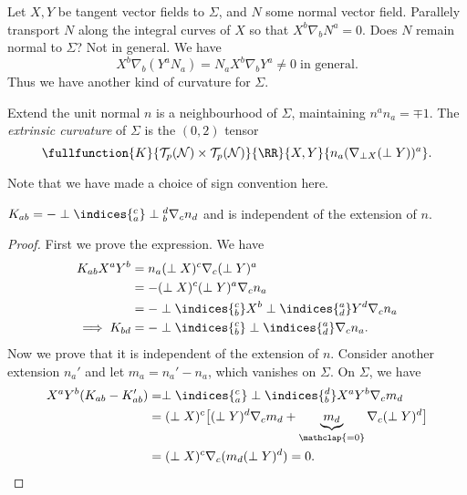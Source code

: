 \documentclass{jknotes}
\begin{document}
Let \(X,Y\) be tangent vector fields to \(\Sigma\), and \(N\) some normal vector field. Parallely transport \(N\) along the integral curves of \(X\) so that \(X^b\nabla_b N^a = 0\). Does \(N\) remain normal to \(\Sigma\)? Not in general. We have
\begin{equation}
    X^b\nabla_b(Y^a N_a) = N_aX^b\nabla_bY^a \ne 0 \;\text{in general}.
\end{equation}
Thus we have another kind of curvature for \(\Sigma\).
\begin{defn}
    Extend the unit normal \(n\) is a neighbourhood of \(\Sigma\), maintaining \(n^an_a = \mp 1\). The \emph{extrinsic curvature} of \(\Sigma\) is the \((0,2)\) tensor 
    \begin{equation}
        \fullfunction{K}{\mathcal{T}_p(\mathcal{N})\times\mathcal{T}_p(\mathcal{N})}{\RR}{X,Y}{n_a(\nabla_{\perp X}(\perp Y))^a}.
    \end{equation}
\end{defn}
Note that we have made a choice of sign convention here.
\begin{lemma}
    \(K_{ab} = -\perp\indices{^c_a}\perp{^d_b}\nabla_c n_d\) and is independent of the extension of \(n\).
\end{lemma}
\begin{proof}
    First we prove the expression. We have
    \begin{align}
        K_{ab}X^aY^b &= n_a(\perp X)^c\nabla_c(\perp Y)^a \\
                     &= -(\perp X)^c(\perp Y)^a\nabla_c n_a \\
                     &= -\perp\indices{^c_b}X^b\perp\indices{^a_d}Y^d\nabla_c n_a \\
        \implies K_{bd} &= -\perp\indices{^c_b}\perp\indices{^a_d}\nabla_c n_a.
    \end{align}
    Now we prove that it is independent of the extension of \(n\). Consider another extension \(n_a'\) and let \(m_a=n_a'-n_a\), which vanishes on \(\Sigma\). On \(\Sigma\), we have
    \begin{align}
        X^a Y^b(K_{ab}-K'_{ab}) &= \perp\indices{^c_a}\perp\indices{^d_b}X^aY^b\nabla_c m_d \\
                                &= (\perp X)^c \big[(\perp Y)^d\nabla_cm_d + \underbrace{m_d}_{\mathclap{=0}}\nabla_c(\perp Y)^d\big]\\
                                &= (\perp X)^c \nabla_c (m_d(\perp Y)^d) = 0.
    \end{align}
\end{proof}
\end{document}
